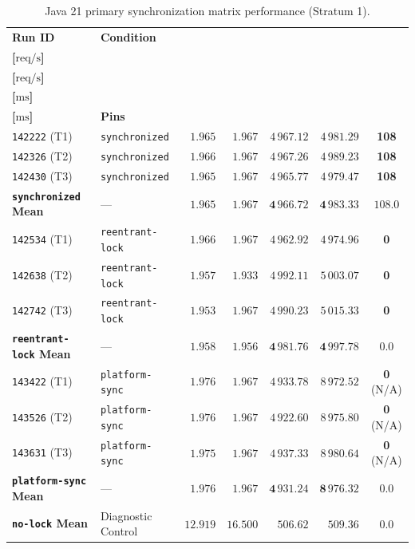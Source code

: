 \begin{table}[htbp]
  \centering
  \small
  \setlength{\tabcolsep}{4pt}
  \caption{Java 21 primary synchronization matrix performance (Stratum 1).}
  \label{tab:primary-sync-matrix}
  \begin{tabularx}{\textwidth}{@{}l >{\raggedright\arraybackslash}X r r r r c@{}}
    \toprule
    \textbf{Run ID} & \textbf{Condition} & \shortstack{\textbf{Whole}\\\textbf{[$\text{req/s}$]}} & \shortstack{\textbf{Steady}\\\textbf{[$\text{req/s}$]}} & \shortstack{\textbf{$p50$}\\\textbf{[$\text{ms}$]}} & \shortstack{\textbf{$p95$}\\\textbf{[$\text{ms}$]}} & \textbf{Pins} \\
    \midrule
    \texttt{142222} (T1) & \texttt{synchronized} & $1.965$ & $1.967$ & $4\,967.12$ & $4\,981.29$ & \textbf{108} \\
    \texttt{142326} (T2) & \texttt{synchronized} & $1.966$ & $1.967$ & $4\,967.26$ & $4\,989.23$ & \textbf{108} \\
    \texttt{142430} (T3) & \texttt{synchronized} & $1.965$ & $1.967$ & $4\,965.77$ & $4\,979.47$ & \textbf{108} \\
    \textbf{\texttt{synchronized} Mean} & --- & $\mathbf{1.965}$ & $\mathbf{1.967}$ & $\mathbf{4\,966.72}$ & $\mathbf{4\,983.33}$ & $\mathbf{108.0}$ \\
    \midrule
    \texttt{142534} (T1) & \texttt{reentrant-lock} & $1.966$ & $1.967$ & $4\,962.92$ & $4\,974.96$ & \textbf{0} \\
    \texttt{142638} (T2) & \texttt{reentrant-lock} & $1.957$ & $1.933$ & $4\,992.11$ & $5\,003.07$ & \textbf{0} \\
    \texttt{142742} (T3) & \texttt{reentrant-lock} & $1.953$ & $1.967$ & $4\,990.23$ & $5\,015.33$ & \textbf{0} \\
    \textbf{\texttt{reentrant-lock} Mean} & --- & $\mathbf{1.958}$ & $\mathbf{1.956}$ & $\mathbf{4\,981.76}$ & $\mathbf{4\,997.78}$ & $\mathbf{0.0}$ \\
    \midrule
    \texttt{143422} (T1) & \texttt{platform-sync} & $1.976$ & $1.967$ & $4\,933.78$ & $8\,972.52$ & \textbf{0} (N/A) \\
    \texttt{143526} (T2) & \texttt{platform-sync} & $1.976$ & $1.967$ & $4\,922.60$ & $8\,975.80$ & \textbf{0} (N/A) \\
    \texttt{143631} (T3) & \texttt{platform-sync} & $1.975$ & $1.967$ & $4\,937.33$ & $8\,980.64$ & \textbf{0} (N/A) \\
    \textbf{\texttt{platform-sync} Mean} & --- & $\mathbf{1.976}$ & $\mathbf{1.967}$ & $\mathbf{4\,931.24}$ & $\mathbf{8\,976.32}$ & $\mathbf{0.0}$ \\
    \midrule
    \textbf{\texttt{no-lock} Mean} & Diagnostic Control & $\mathbf{12.919}$ & $\mathbf{16.500}$ & $\mathbf{506.62}$ & $\mathbf{509.36}$ & $\mathbf{0.0}$ \\
    \bottomrule
  \end{tabularx}
\end{table}

